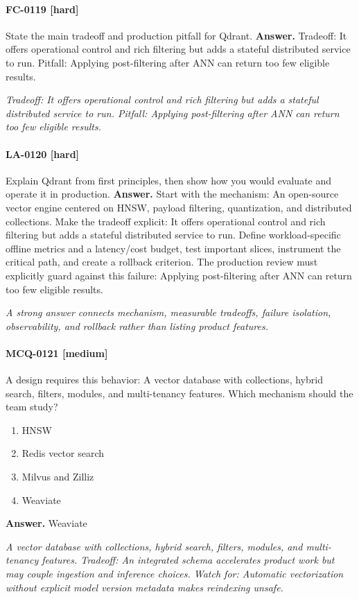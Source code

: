 \paragraph{FC-0119 [hard]} State the main tradeoff and production pitfall for Qdrant.
\noindent\textbf{Answer.} Tradeoff: It offers operational control and rich filtering but adds a stateful distributed service to run. Pitfall: Applying post-filtering after ANN can return too few eligible results.
\par\textit{Tradeoff: It offers operational control and rich filtering but adds a stateful distributed service to run. Pitfall: Applying post-filtering after ANN can return too few eligible results.}
\paragraph{LA-0120 [hard]} Explain Qdrant from first principles, then show how you would evaluate and operate it in production.
\noindent\textbf{Answer.} Start with the mechanism: An open-source vector engine centered on HNSW, payload filtering, quantization, and distributed collections. Make the tradeoff explicit: It offers operational control and rich filtering but adds a stateful distributed service to run. Define workload-specific offline metrics and a latency/cost budget, test important slices, instrument the critical path, and create a rollback criterion. The production review must explicitly guard against this failure: Applying post-filtering after ANN can return too few eligible results.
\par\textit{A strong answer connects mechanism, measurable tradeoffs, failure isolation, observability, and rollback rather than listing product features.}
\paragraph{MCQ-0121 [medium]} A design requires this behavior: A vector database with collections, hybrid search, filters, modules, and multi-tenancy features. Which mechanism should the team study?
\begin{enumerate}[label=\Alph*.]
\item HNSW
\item Redis vector search
\item Milvus and Zilliz
\item Weaviate
\end{enumerate}
\noindent\textbf{Answer.} Weaviate
\par\textit{A vector database with collections, hybrid search, filters, modules, and multi-tenancy features. Tradeoff: An integrated schema accelerates product work but may couple ingestion and inference choices. Watch for: Automatic vectorization without explicit model version metadata makes reindexing unsafe.}
